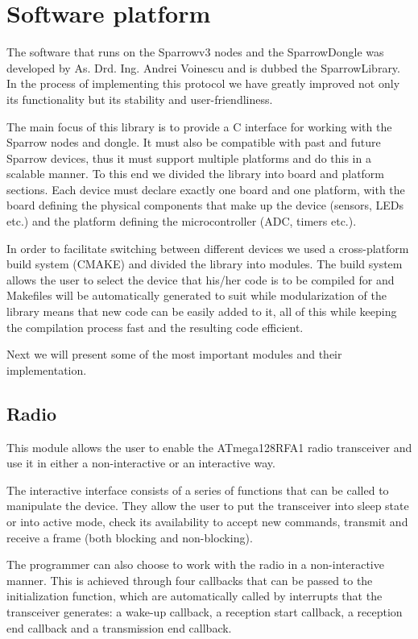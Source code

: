 
\chapter{Software platform}

The software that runs on the Sparrowv3 nodes and the SparrowDongle was
developed by As. Drd. Ing. Andrei Voinescu and is dubbed the SparrowLibrary.
In the process of implementing this protocol we have greatly improved not only
its functionality but its stability and user-friendliness.

The main focus of this library is to provide a C interface for working with the
Sparrow nodes and dongle. It must also be compatible with past and future
Sparrow devices, thus it must support multiple platforms and do this in a
scalable manner. To this end we divided the library into board and platform
sections.  Each device must declare exactly one board and one platform, with
the board defining the physical components that make up the device (sensors,
LEDs etc.) and the platform defining the microcontroller (ADC, timers etc.). 

In order to facilitate switching between different devices we used a
cross-platform build system (CMAKE) and divided the library into modules. The
build system allows the user to select the device that his/her code is to be
compiled for and Makefiles will be automatically generated to suit while
modularization of the library means that new code can be easily added to it, all
of this while keeping the compilation process fast and the resulting code
efficient.

Next we will present some of the most important modules and their
implementation.

\section{Radio}

This module allows the user to enable the ATmega128RFA1 radio transceiver and
use it in either a non-interactive or an interactive way. 

The interactive interface consists of a series of functions that can be called
to manipulate the device. They allow the user to put the transceiver into 
sleep state or into active mode, check its availability to accept new
commands, transmit and receive a frame (both blocking and non-blocking).

The programmer can also choose to work with the radio in a non-interactive
manner. This is achieved through four callbacks that can be passed to the
initialization function, which are automatically called by interrupts that
the transceiver generates: a wake-up callback, a reception start callback, a
reception end callback and a transmission end callback. 

